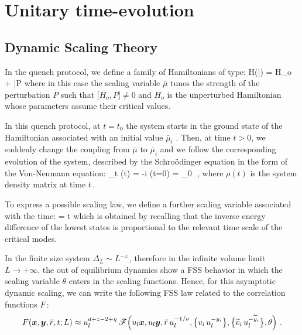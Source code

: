 \section{Unitary time-evolution}



\subsection{Dynamic Scaling Theory}

In the quench protocol, we define a family of Hamiltonians of type:
H(\bar \mu) = H_o + \bar\mu P \cm
\ea
where in this case the scaling variable $\bar \mu$ tunes the strength of the perturbation
$P$ such that $\Bigr[ H_o , P] \neq 0$ and $H_o$ is the unperturbed Hamiltonian 
whose parameters assume their critical values.

In this quench protocol, at $t = t_0$ the system starts in the ground state
of the Hamiltonian associated with an initial value $\bar \mu_i$ . Then, at time $t>0$, we
suddenly change the coupling from $\bar \mu$ to $\bar \mu _i$ and we follow the 
corresponding evolution of the system, described by the Schro\"odinger equation
in the form of the Von-Neumann equation:
\partial_t \rho(t) = -i  \qquad \rho(t=0) = \rho_0 \,\,,
\ea
where $\rho(t)$ is the system density matrix at time $t\,$.

To express a possible scaling law, we define a further scaling variable associated
with the time:
\theta = t \Delta \cm
\ee
which is obtained by recalling that the inverse energy difference of the lowest states
is proportional to the relevant time scale of the critical modes.

$ $\\

In the finite size system $\Delta _L \sim L^{-z}\,$, therefore in the infinite volume limit $L\to +\infty$, the out of equilibrium dynamics show a FSS behavior in which the scaling variable $\theta$ enters in the scaling functions. Hence, for this asymptotic dynamic scaling, we can write the following FSS law related to the correlation functions $F\,$: 
\begin{equation}  
\label{dfss-C}
F(\bm x, \bm y, \bar r, t;L) \approx u_l^{d+z-2+\eta} \,\mathscr{F}\Bigl(u_l\bm x ,u_l\bm y, \bar r\,u_l^{-1/\nu}, \bigl\{v_i\,u_l^{-y_i}\bigl\},  \bigl\{\widetilde{v}_i\,u_l^{-\widetilde{y}_i}\bigl\}, \theta  \Bigl) \,\,.
\end{equation}

